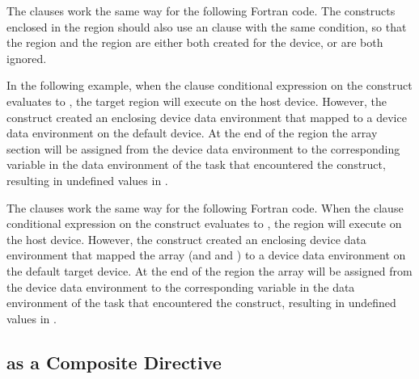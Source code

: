 
The  clauses work the same way for the following Fortran code. The  
constructs enclosed in the  region should also use 
an  clause with the same condition, so that the  
region and the  region are either both created for the device, or 
are both ignored.


In the following example, when the  clause conditional expression on 
the  construct evaluates to , the target region will 
execute on the host device. However, the  construct 
created an enclosing device data environment that mapped  to a device data 
environment on the default device. At the end of the  
region the array section  will be assigned from the device data environment 
to the corresponding variable in the data environment of the task that encountered 
the  construct, resulting in undefined values in .


The  clauses work the same way for the following Fortran code. When 
the  clause conditional expression on the  construct 
evaluates to , the  region will execute on the host 
device. However, the  construct created an enclosing 
device data environment that mapped the  array (and  and ) to a device data 
environment on the default target device. At the end of the  
region the  array will be assigned from the device data environment to the corresponding 
variable in the data environment of the task that encountered the  construct, resulting in undefined values in .


\subsection{ as a Composite Directive}
\label{subsec:composite_target_data}

